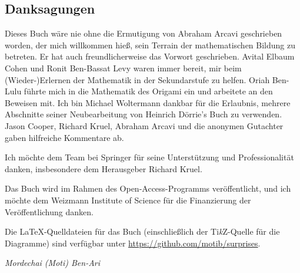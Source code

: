 \subsection*{Danksagungen}

Dieses Buch wäre nie ohne die Ermutigung von Abraham Arcavi geschrieben worden, der mich willkommen hieß, sein Terrain der mathematischen Bildung zu betreten. Er hat auch freundlicherweise das Vorwort geschrieben. Avital Elbaum Cohen und Ronit Ben-Bassat Levy waren immer bereit, mir beim (Wieder-)Erlernen der Mathematik in der Sekundarstufe zu helfen. Oriah Ben-Lulu führte mich in die Mathematik des Origami ein und arbeitete an den Beweisen mit. Ich bin Michael Woltermann dankbar für die Erlaubnis, mehrere Abschnitte seiner Neubearbeitung von Heinrich D\"{o}rrie's Buch zu verwenden. Jason Cooper, Richard Kruel, Abraham Arcavi und die anonymen Gutachter gaben hilfreiche Kommentare ab.

Ich möchte dem Team bei Springer für seine Unterstützung und Professionalität danken, insbesondere dem Herausgeber Richard Kruel.

Das Buch wird im Rahmen des Open-Access-Programms veröffentlicht, und ich möchte dem Weizmann Institute of Science für die Finanzierung der Veröffentlichung danken.

Die \LaTeX{}-Quelldateien für das Buch (einschließlich der Ti\textit{k}Z-Quelle für die Diagramme) sind verfügbar unter
\url{https://github.com/motib/surprises}.
\enlargethispage{\baselineskip}
\begin{flushright}
\textit{Mordechai (Moti) Ben-Ari}
\end{flushright}

\tableofcontents

